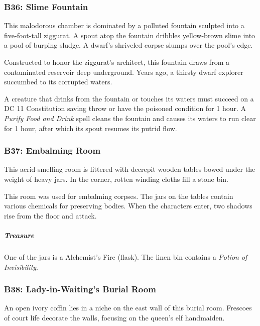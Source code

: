\documentclass[10pt,a4paper,twoside,bg=print,twocolumn,openany,nodeprecatedcode]{dndbook}
\begin{document}
\subsubsection{B36: Slime Fountain}
\begin{DndReadAloud}{}
This malodorous chamber is dominated by a polluted fountain sculpted into a five-foot-tall ziggurat. A spout atop the fountain dribbles yellow-brown slime into a pool of burping sludge. A dwarf's shriveled corpse slumps over the pool's edge.

\end{DndReadAloud}

Constructed to honor the ziggurat's architect, this fountain draws from a contaminated reservoir deep underground. Years ago, a thirsty dwarf explorer succumbed to its corrupted waters.

A creature that drinks from the fountain or touches its waters must succeed on a DC 11 Constitution saving throw or have the poisoned condition for 1 hour. A \textit{Purify Food and Drink} spell cleans the fountain and causes its waters to run clear for 1 hour, after which its spout resumes its putrid flow.

\subsubsection{B37: Embalming Room}
\begin{DndReadAloud}{}
This acrid-smelling room is littered with decrepit wooden tables bowed under the weight of heavy jars. In the corner, rotten winding cloths fill a stone bin.

\end{DndReadAloud}

This room was used for embalming corpses. The jars on the tables contain various chemicals for preserving bodies. When the characters enter, two shadows rise from the floor and attack.

\subparagraph{Treasure}
One of the jars is a Alchemist's Fire (flask). The linen bin contains a \textit{Potion of Invisibility}.

\subsubsection{B38: Lady-in-Waiting's Burial Room}
\begin{DndReadAloud}{}
An open ivory coffin lies in a niche on the east wall of this burial room. Frescoes of court life decorate the walls, focusing on the queen's elf handmaiden.

\end{DndReadAloud}
\end{document}

